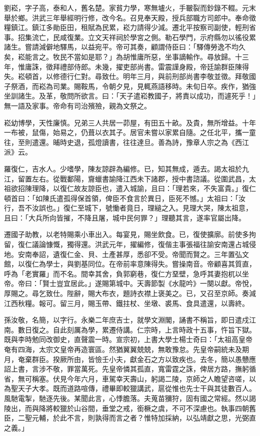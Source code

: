 \begin{pinyinscope}
劉崧，字子高，泰和人，舊名楚。家貧力學，寒無壚火，手皸裂而鈔錄不輟。元末舉於鄉。洪武三年舉經明行修，改今名。召見奉天殿，授兵部職方司郎中。奉命徵糧鎮江。鎮江多勛臣田，租賦為民累，崧力請得少減。遷北平按察司副使，輕刑省事。招集流亡，民咸復業。立文天祥祠於學宮之側。勒石學門，示府縣勿以徭役累諸生。嘗請減僻地驛馬，以益宛平。帝可其奏，顧謂侍臣曰：「驛傳勞逸不均久矣，崧能言之。牧民不當如是耶？」為胡惟庸所惡，坐事謫輸作。尋放歸。十三年，惟庸誅，徵拜禮部侍郎。未幾，擢吏部尚書。雷震謹身殿，帝廷諭群臣陳得失。崧頓首，以修德行仁對。尋致仕。明年三月，與前刑部尚書李敬並徵。拜敬國子祭酒，而崧為司業。賜鞍馬，令朝夕見，見輒燕語移時。未旬日卒。疾作，猶強坐訓諸生。及革，敬問所欲言。曰：「天子遣崧教國子，將責以成功，而遽死乎！」無一語及家事。帝命有司治殯殮，親為文祭之。

崧幼博學，天性廉慎。兄弟三人共居一茆屋，有田五十畝。及貴，無所增益。十年一布被，鼠傷，始易之，仍葺以衣其子。居官未嘗以家累自隨。之任北平，攜一童往，至則遣還。晡時史退，孤燈讀書，往往達旦。善為詩，豫章人宗之為《西江派》云。

羅復仁，吉水人。少嗜學，陳友諒辟為編修。已，知其無成，遁去。謁太祖於九江，留置左右。從戰鄱陽，齎蠟書諭降江西未下諸郡，授中書諮議。從圍武昌，太祖欲招陳理降，以復仁故友諒臣也，遣入城諭，且曰：「理若來，不失富貴。」復仁頓首曰：「如陳氏遣孤得保首領，俾臣不食言於異日，臣死不憾。」太祖曰：「汝行，吾不汝誤也。」復仁至城下，號慟者竟日，理縋之入。見理大哭，陳太祖意，且曰：「大兵所向皆摧，不降且屠，城中民何罪？」理聽其言，遂率官屬出降。

遷國子助教，以老特賜乘小車出入。每宴見，賜坐飲食。已，復使擴廓。前使多拘留，復仁議論慷慨，獨得還。洪武元年，擢編修，復偕主事張福往諭安南還占城侵地。安南奉詔，遺復仁金、貝、土產甚厚，悉卻不受。帝聞而賢之。三年置弘文館，以復仁為學士，與劉基同位。在帝前率意陳得失。嘗操南音。帝顧喜其質直，呼為「老實羅」而不名。間幸其舍，負郭窮巷，復仁方堊壁，急呼其妻抱杌以坐帝。帝曰：「賢士豈宜居此。」遂賜第城中。天壽節製《水龍吟》一闋以獻。帝悅，厚賜之。尋乞致仕。陛辭，賜大布衣，題詩衣襟上褒美之。已，又召至京師。奏減江西秋糧。報可。留三月，賜玉帶、鐵拄杖、坐墩、裘馬、食具遣還，以壽終。

孫汝敬，名簡，以字行。永樂二年庶吉士，就學文淵閣，誦書不稱旨，即日遣戍江南。數日復之。自此刻厲為學，累遷侍講。仁宗時，上言時政十五事，忤旨下獄。既與李時勉同改御史，直聲震一時。宣宗初，上書大學士楊士奇曰：「太祖高皇帝奄有四海，太宗文皇帝再造寰區。然猶翼翼兢兢，無敢豫怠。先皇帝嗣統未及期月，奄棄群臣。揆厥所由，皆憸壬小夫，獻金石之方以致疾也。去冬，簡以愚戇應詔上書，言涉不敬，罪當萬死。先皇帝憐其孤直，寬雷霆之誅，俾居方路，撫躬循省，無可稱塞。伏見今年六月，車駕幸天壽山，躬謁二陵，京師之人瞻望咨嗟，以為聖天子大孝。既而道路喧傳，禮畢即較獵講武，扈從惟也先士干與其徒數百人。風馳電掣，馳逐先後。某聞此言，心悸膽落。夫蒐苗獼狩，固有國之常經。然以謁陵出，而與降將較獵於山谷間，垂堂之戒，銜橛之虞，不可不深慮也。執事四朝舊臣，二聖元輔，於此不言，則孰得而言之者？惟特加採納，以弘靖獻之思，光弼直之義。」


\end{pinyinscope}
